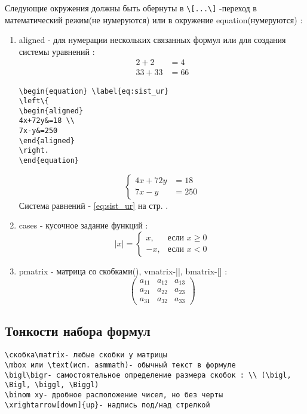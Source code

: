 \documentclass[a4paper,12pt]{article}%
\theoremstyle{plain}%
\theoremstyle{definition}%
\theoremstyle{remark}%
\begin{document}
Следующие окружения должны быть обернуты в \verb|\[...\]| -переход в математический режим(не нумеруются) или в окружение equation(нумеруются) : \\
\begin{enumerate}
\item aligned - для нумерации нескольких связанных формул или для создания системы уравнений :
\begin{equation}
\begin{aligned}
2+2&=4 \\
33+33&=66
\end{aligned}
\end{equation}
\begin{verbatim}
\begin{equation} \label{eq:sist_ur}
\left\{
\begin{aligned}
4x+72y&=18 \\
7x-y&=250
\end{aligned}
\right.
\end{equation}
\end{verbatim}
\begin{equation} \label{eq:sist_ur}
\left\{
\begin{aligned}
4x+72y&=18 \\
7x-y&=250
\end{aligned}
\right.
\end{equation}
Система равнений - \eqref{eq:sist_ur} на стр. \pageref{eq:sist_ur}.
\item cases - кусочное задание функций :
\[
|x|=\begin{cases}
x, &\text{если } x \ge 0 \\
-x, &\text{если } x < 0
\end{cases}
\]
\item pmatrix - матрица со скобками(), vmatrix-||, bmatrix-[] :
\[
\begin{pmatrix}
a_{11}&a_{12}&a_{13} \\
a_{21}&a_{22}&a_{23} \\
a_{31}&a_{32}&a_{33}
\end{pmatrix}
\]
\end{enumerate}



\subsection{Тонкости набора формул}

\begin{verbatim}
\скобка\matrix- любые скобки у матрицы
\mbox или \text(исп. asmmath)- обычный текст в формуле
\bigl\bigr- самостоятельное определение размера скобок : \\ (\bigl, \Bigl, \biggl, \Biggl)
\binom xy- дробное расположение чисел, но без черты
\xrightarrow[down]{up}- надпись под/над стрелкой
\end{verbatim}
\end{document}
